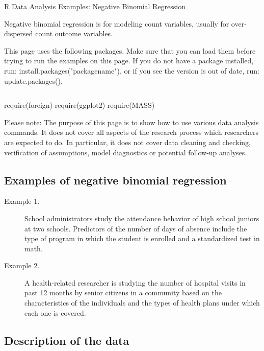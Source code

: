 
R Data Analysis Examples: Negative Binomial Regression

Negative binomial regression is for modeling count variables, usually for over-dispersed count outcome variables.

This page uses the following packages. Make sure that you can load them before trying to run the examples on this page. If you do not have a package installed, run: install.packages("packagename"), or if you see the version is out of date, run: update.packages().

\begin{framed}
\begin{verbatim}

\end{verbatim}
require(foreign)
require(ggplot2)
require(MASS)
\end{framed}

Please note: The purpose of this page is to show how to use various data analysis commands. It does not cover all aspects of the research process which researchers are expected to do. In particular, it does not cover data cleaning and checking, verification of assumptions, model diagnostics or potential follow-up analyses.

\subsection*{Examples of negative binomial regression}

\begin{description}
\item[Example 1.] School administrators study the attendance behavior of high school juniors at two schools. Predictors of the number of days of absence include the type of program in which the student is enrolled and a standardized test in math. 

\item[Example 2.] A health-related researcher is studying the number of hospital visits in past 12 months by senior citizens in a community based on the characteristics of the individuals and the types of health plans under which each one is covered.

\end{description}
\subsection*{Description of the data}

